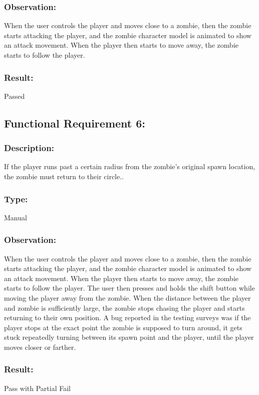 \documentclass[12pt, titlepage]{article}
\begin{document}
\subsubsection{Observation: } When the user controls the player and moves close to a zombie, then the zombie starts attacking the player, and the zombie character model is animated to show an attack movement. When the player then starts to move away, the zombie starts to follow the player.

\subsubsection[Pass / Fail:] {Result: } Passed


\subsection{Functional Requirement 6: } 

\subsubsection{Description: }If the player runs past a certain radius from the zombie's original spawn location, the zombie must return to their circle..

\subsubsection{Type: } Manual

\subsubsection{Observation: } When the user controls the player and moves close to a zombie, then the zombie starts attacking the player, and the zombie character model is animated to show an attack movement. When the player then starts to move away, the zombie starts to follow the player. The user then presses and holds the shift button while moving the player away from the zombie. When the distance between the player and zombie is sufficiently large, the zombie stops chasing the player and starts returning to their own position. A bug reported in the testing surveys was if the player stops at the exact point the zombie is supposed to turn around, it gets stuck repeatedly turning between its spawn point and the player, until the player moves closer or farther.

\subsubsection[Pass / Fail:] {Result: } Pass with Partial Fail
\end{document}
